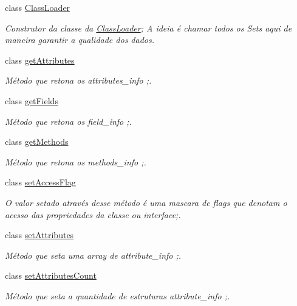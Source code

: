 \begin{DoxyCompactItemize}
\item 
class \hyperlink{class_class_loader_1_1_class_loader}{Class\+Loader}
\begin{DoxyCompactList}\small\item\em Construtor da classe da \hyperlink{class_class_loader_1_1_class_loader}{Class\+Loader}; A ideia é chamar todos os Set\textquotesingle{}s aqui de maneira garantir a qualidade dos dados. \end{DoxyCompactList}\item 
class \hyperlink{class_class_loader_1_1get_attributes}{get\+Attributes}
\begin{DoxyCompactList}\small\item\em Método que retona os attributes\+\_\+info ;. \end{DoxyCompactList}\item 
class \hyperlink{class_class_loader_1_1get_fields}{get\+Fields}
\begin{DoxyCompactList}\small\item\em Método que retona os field\+\_\+info ;. \end{DoxyCompactList}\item 
class \hyperlink{class_class_loader_1_1get_methods}{get\+Methods}
\begin{DoxyCompactList}\small\item\em Método que retona os methods\+\_\+info ;. \end{DoxyCompactList}\item 
class \hyperlink{class_class_loader_1_1set_access_flag}{set\+Access\+Flag}
\begin{DoxyCompactList}\small\item\em O valor setado através desse método é uma mascara de flags que denotam o acesso das propriedades da classe ou interface;. \end{DoxyCompactList}\item 
class \hyperlink{class_class_loader_1_1set_attributes}{set\+Attributes}
\begin{DoxyCompactList}\small\item\em Método que seta uma array de attribute\+\_\+info ;. \end{DoxyCompactList}\item 
class \hyperlink{class_class_loader_1_1set_attributes_count}{set\+Attributes\+Count}
\begin{DoxyCompactList}\small\item\em Método que seta a quantidade de estruturas attribute\+\_\+info ;. \end{DoxyCompactList}\item 

\end{DoxyCompactItemize}
